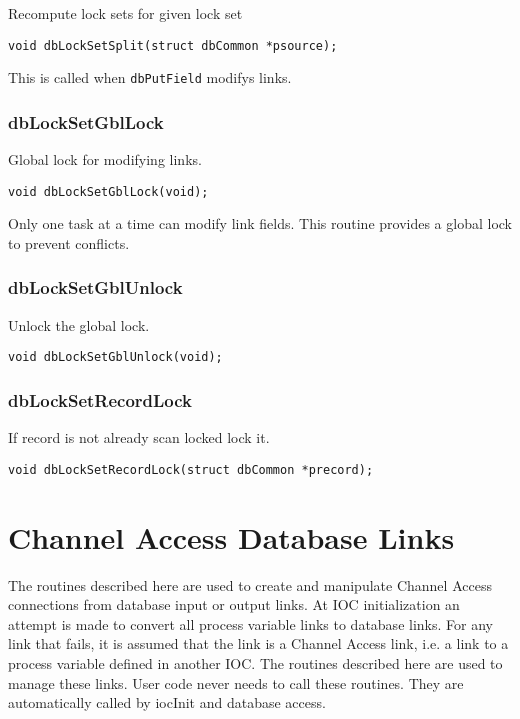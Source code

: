 Recompute lock sets for given lock set

\begin{verbatim}
void dbLockSetSplit(struct dbCommon *psource);
\end{verbatim}

This is called when \verb|dbPutField| modifys links.

\subsubsection{dbLockSetGblLock}

Global lock for modifying links.

\begin{verbatim}
void dbLockSetGblLock(void);
\end{verbatim}

Only one task at a time can modify link fields. This routine provides a global lock to prevent conflicts.

\subsubsection{dbLockSetGblUnlock}

Unlock the global lock.

\begin{verbatim}
void dbLockSetGblUnlock(void);
\end{verbatim}

\subsubsection{dbLockSetRecordLock}

If record is not already scan locked lock it.

\begin{verbatim}
void dbLockSetRecordLock(struct dbCommon *precord);
\end{verbatim}

\section{Channel Access Database Links}

The routines described here are used to create and manipulate Channel Access connections from database input or output 
links. At IOC initialization an attempt is made to convert all process variable links to database links. For any link that 
fails, it is assumed that the link is a Channel Access link, i.e. a link to a process variable defined in another IOC. The 
routines described here are used to manage these links. User code never needs to call these routines. They are 
automatically called by iocInit and database access.

